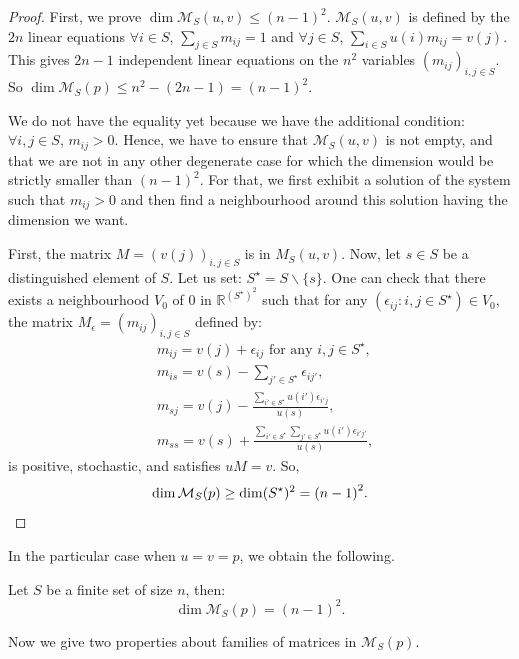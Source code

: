 \documentclass[AHL,Unicode,longabstracts]{cedram}
\newcounter{a}
\newcommand{\RR}{\mathbb{R}}
\let\oldforall\forall
\renewcommand*{\forall}{\mathrel{\oldforall}}
\begin{document}
\begin{proof}
First, we prove $\dim \mathcal{M}_S(u,v) \leq (n-1)^2$. $\mathcal{M}_S(u,v)$ is defined by the $2n$ linear equations $\forall i\in S$, $\sum_{j\in S} m_{ij} = 1$ and $\forall j\in S$, $\sum_{i\in S} u(i) m_{ij} = v(j)$. This gives $2n-1$ independent linear equations on the $n^2$ variables $(m_{ij})_{i,j \in S}$. So $\dim \mathcal{M}_S(p) \leq n^2 - (2n-1) = (n-1)^2$.

We do not have the equality yet because we have the additional condition: $\forall i,j\in S$, $m_{ij}>0$. Hence, we have to ensure that $\mathcal{M}_S(u,v)$ is not empty, and that we are not in any other degenerate case for which the dimension would be strictly smaller than $(n-1)^2$. For that, we first exhibit a solution of the system such that $m_{ij}>0$ and then find a neighbourhood around this solution having the dimension we want.

First, the matrix $M = (v(j))_{i,j \in S}$ is in $M_S(u,v)$. Now, let $s \in S$ be a distinguished element of $S$. Let us set: $S^\star = S \backslash \{s\}$. One can check that there exists a neighbourhood $V_0$ of $0$ in $\RR^{(S^\star)^2}$ such that for any $(\epsilon_{ij} : i,j \in S^\star) \in V_0$, the matrix $M_{\epsilon} = (m_{ij})_{i,j \in S}$ defined by:
\begin{align*}
& m_{ij} = v(j)+\epsilon_{ij} \text{ for any } i,j \in S^\star,\\
& m_{is} = v(s) - \sum_{j' \in S^\star} \epsilon_{ij'},\\
& m_{sj} = v(j) - \frac{\sum_{i' \in S^\star} u(i') \epsilon_{i'j}}{u(s)},\\
& m_{ss} = v(s) + \frac{\sum_{i' \in S^\star} \sum_{j' \in S^\star} u(i') \epsilon_{i'j'}}{u(s)},
\end{align*}
is positive, stochastic, and satisfies $uM=v$. So,
\[
\dim \mathcal{M}_S(p) \geq \dim (S^\star)^2={(n-1)}^2.
\qedhere
\]
\end{proof}

In the particular case when $u=v=p$, we obtain the following.

\begin{coro}\label{cor:dim-mp}
Let $S$ be a finite set of size $n$, then:
\begin{equation*}
\dim \mathcal{M}_S(p) = (n-1)^2.
\end{equation*}
\end{coro}

Now we give two properties about families of matrices in $\mathcal{M}_S(p)$.
\end{document}
